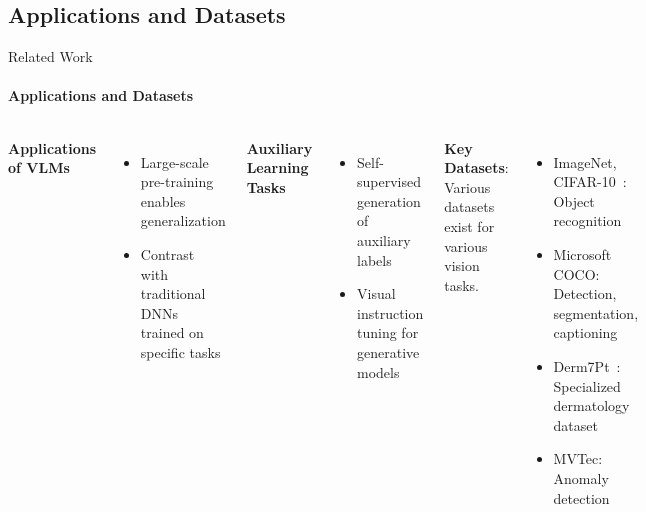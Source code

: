 \documentclass[aspectratio=169]{beamer}
\begin{document}
\subsection{Applications and Datasets}
\begin{frame}{Related Work}
\framesubtitle{Applications and Datasets}
  \begin{columns}[T]
      \textbf{Applications of VLMs}
      \begin{itemize}
        \item Large-scale pre-training enables generalization
        \item Contrast with traditional DNNs trained on specific tasks
      \end{itemize}
      \vspace{0.5em}
      \textbf{Auxiliary Learning Tasks}
      \begin{itemize}
        \item Self-supervised generation of auxiliary labels~
        \item Visual instruction tuning for generative models~
      \end{itemize}
      \textbf{Key Datasets}:
      Various datasets exist for various vision tasks.
      \begin{itemize}
        \item ImageNet, CIFAR-10~: Object recognition
        \item Microsoft COCO: Detection, segmentation, captioning
        \item Derm7Pt~: Specialized dermatology dataset
        \item MVTec: Anomaly detection
      \end{itemize}
  \end{columns}
\end{frame}
\end{document}
